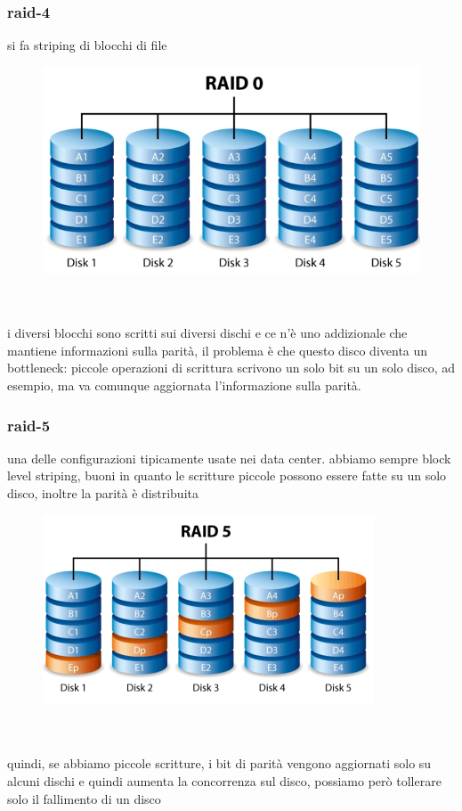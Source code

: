 \documentclass[12pt, oneside]{extbook} %
\begin{document}
\subsubsection{raid-4}
si fa striping di blocchi di file\\
\begin{figure}[!h]
	\includegraphics[scale=0.4]{immagini/raid0.png}
\end{figure}\\\\
i diversi blocchi sono scritti sui diversi dischi e ce n'è uno addizionale che mantiene informazioni sulla parità, il problema è che questo disco diventa un bottleneck: piccole operazioni di scrittura scrivono un solo bit su un solo disco, ad esempio, ma va comunque aggiornata l'informazione sulla parità.
\subsubsection{raid-5}
una delle configurazioni tipicamente usate nei data center. abbiamo sempre block level striping, buoni in quanto le scritture piccole possono essere fatte su un solo disco, inoltre la parità è distribuita\\
\begin{figure}[!h]
	\includegraphics[scale=0.4]{immagini/raid5.png}
\end{figure}\\\\
quindi, se abbiamo piccole scritture, i bit di parità vengono aggiornati solo su alcuni dischi e quindi aumenta la concorrenza sul disco, possiamo però tollerare solo il fallimento di un disco
\end{document}
